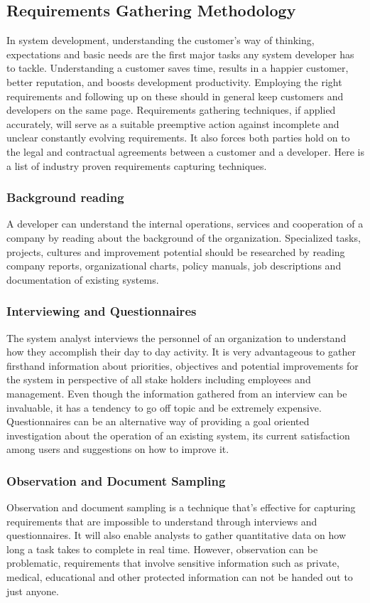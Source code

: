 \subsection{Requirements Gathering Methodology}

In system development, understanding the customer's way of thinking,
expectations and basic needs are the first major tasks any system developer has to
tackle. Understanding a customer saves time, results in a happier customer,
better reputation, and boosts development productivity. Employing the right
requirements and following up on these should in general keep customers and 
developers on the same page.
Requirements gathering techniques, if applied accurately, will serve as a
suitable preemptive action against incomplete and unclear constantly evolving
requirements. It also forces both parties hold on to the legal and
contractual agreements between a customer and a developer. Here is a list of
industry proven requirements capturing techniques.

\subsubsection{Background reading}

A developer can understand the internal operations, services and cooperation of
a company by reading about the background of the organization. Specialized
tasks, projects, cultures and improvement potential should be 
researched by reading company reports, organizational charts, policy manuals,
job descriptions and documentation of existing systems.

\subsubsection{Interviewing and Questionnaires}

The system analyst interviews the personnel of an organization to understand how
they accomplish their day to day activity. It is very advantageous to gather
firsthand information about priorities, objectives and potential improvements
for the system in perspective of all stake holders including employees and
management. Even though the information gathered from an
interview can be invaluable, it has a tendency to go off topic and be
extremely expensive. Questionnaires can be an alternative way of providing
a goal oriented investigation about the operation of an existing system, 
its current satisfaction among users and suggestions on how to improve it.

\subsubsection{Observation and Document Sampling}

Observation and document sampling is a technique that's effective for capturing
requirements that are impossible to understand through interviews and
questionnaires. It will also enable analysts to gather quantitative data on how
long a task takes to complete in real time. However, observation can be
problematic, requirements that involve sensitive information such as private, 
medical, educational and other protected information can not be handed out to just anyone.